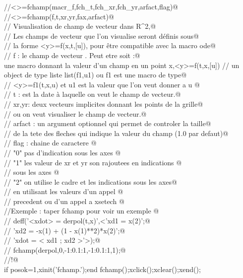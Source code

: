 \verb@//<>=fchamp(macr_f,fch_t,fch_xr,fch_yr,arfact,flag)@ \\
\verb@//<>=fchamp(f,t,xr,yr,fax,arfact)@ \\
\verb@//   Visualisation de champ de vecteur dans R^2,@ \\
\verb@//   Les champs de vecteur que l'on visualise seront d\'efinis sous@ \\
\verb@//   la forme <y>=f(x,t,[u]), pour \^etre compatible avec la macro ode@ \\
\verb@//    f : le champ de vecteur . Peut etre soit :@ \\
	 une macro donnant la valeur d'un champ en un point x,<y>=f(t,x,[u])
\verb@//       un object de type liste list(f1,u1) ou f1 est une macro de type@ \\
\verb@//        <y>=f1(t,x,u) et u1 est la valeur que l'on veut donner a u @ \\
\verb@//    t : est la date \`a laquelle on veut le champ de vecteur.@ \\
\verb@//    xr,yr: deux vecteurs implicites donnant les points de la grille@ \\
\verb@//      ou on veut visualiser le champ de vecteur.@ \\
\verb@//    arfact : un argument optionnel qui permet de controler la taille@ \\
\verb@//      de la tete des fleches qui indique la valeur du champ (1.0 par defaut)@ \\
\verb@//    flag : chaine de caractere @ \\
\verb@//          "0" pas d'indication sous les axes @ \\
\verb@//          "1" les valeur de xr et yr son rajoutees en indications @ \\
\verb@//              sous les axes @ \\
\verb@//          "2" on utilise le cadre et les indications sous les axes@ \\
\verb@//              en utilisant les valeurs d'un appel @ \\
\verb@//  	       precedent  ou d'un appel a  xsetech @ \\
\verb@//Exemple : taper fchamp pour voir un exemple @ \\
\verb@//     deff('<xdot> = derpol(t,x)',<'xd1 = x(2)';@ \\
\verb@//     'xd2 = -x(1) + (1 - x(1)**2)*x(2)';@ \\
\verb@//     'xdot = < xd1 ; xd2 >'>);@ \\
\verb@//      fchamp(derpol,0,-1:0.1:1,-1:0.1:1,1);@ \\
\verb@//!@ \\
if posok=1,xinit('fchamp.');end
fchamp();xclick();xclear();xend();


